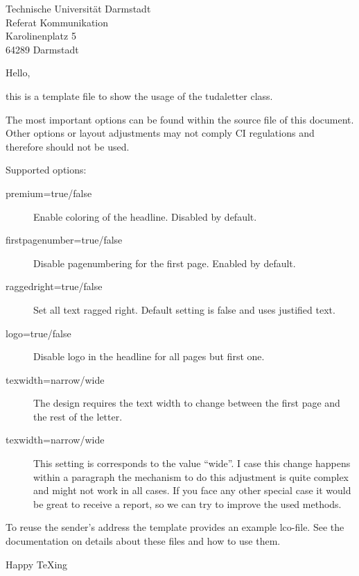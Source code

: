 \documentclass[
	english,%
	accentcolor=9c,%
	premium=true,%
]{tudaletter}
\begin{document}
\begin{letter}{%
	Technische Universität Darmstadt\\%
	Referat Kommunikation\\%
	Karolinenplatz 5\\%
	64289 Darmstadt}


\opening{Hello,}
this is a template file to show the usage of the tudaletter class.

The most important options can be found within the source file of this document.
Other options or layout adjustments may not comply CI regulations and therefore  should not be used.

Supported options:\\
\parbox{\linewidth}{
	\begin{description}
		\item[premium=true/false] Enable coloring of the headline. Disabled by default.
		\item[firstpagenumber=true/false] Disable pagenumbering for the first page. Enabled by default.
		\item[raggedright=true/false] Set all text ragged right. Default setting is false and uses justified text.
		\item[logo=true/false] Disable logo in the headline for all pages but first one.
		\item[texwidth=narrow/wide] The design requires the text width to change between the first page and the rest of the letter.
		\item[texwidth=narrow/wide] This setting is corresponds to the value “wide”.
		      I case this change happens within a paragraph the mechanism to do this adjustment is quite complex and might not work in all cases.
		      If you face any other special case it would be great to receive a report, so we can try to improve the used methods.
	\end{description}
}

To reuse the sender's address the template provides an example lco-file.
See the \KOMAScript{} documentation on details about these files and how to use them.

\closing{Happy \TeX{}ing}


\end{letter}
\end{document}
